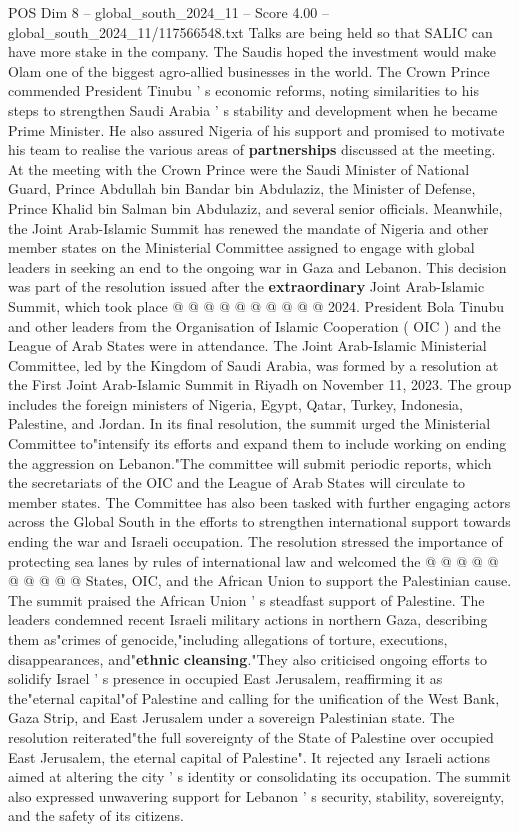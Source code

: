 \begin{textsample}{POS Dim 8 – global\_south\_2024\_11 – Score 4.00 – global\_south\_2024\_11/117566548.txt}  \label{ex:f8_pos_156}
Talks are being held so that SALIC can have more stake in the company.
The Saudis hoped the investment would make Olam one of the biggest agro-allied businesses in the world.
The Crown Prince commended President Tinubu ' s economic reforms, noting similarities to his steps to strengthen Saudi Arabia ' s stability and development when he became Prime Minister.
He also assured Nigeria of his support and promised to motivate his team to realise the various areas of \textbf{partnerships} discussed at the meeting.
At the meeting with the Crown Prince were the Saudi Minister of National Guard, Prince Abdullah bin Bandar bin Abdulaziz, the Minister of Defense, Prince Khalid bin Salman bin Abdulaziz, and several senior officials.
Meanwhile, the Joint Arab-Islamic Summit has renewed the mandate of Nigeria and other member states on the Ministerial Committee assigned to engage with global leaders in seeking an end to the ongoing war in Gaza and Lebanon.
This decision was part of the resolution issued after the \textbf{extraordinary} Joint Arab-Islamic Summit, which took place @ @ @ @ @ @ @ @ @ @ 2024.
President Bola Tinubu and other leaders from the Organisation of Islamic Cooperation ( OIC ) and the League of Arab States were in attendance.
The Joint Arab-Islamic Ministerial Committee, led by the Kingdom of Saudi Arabia, was formed by a resolution at the First Joint Arab-Islamic Summit in Riyadh on November 11, 2023.
The group includes the foreign ministers of Nigeria, Egypt, Qatar, Turkey, Indonesia, Palestine, and Jordan.
In its final resolution, the summit urged the Ministerial Committee to"intensify its efforts and expand them to include working on ending the aggression on Lebanon."The committee will submit periodic reports, which the secretariats of the OIC and the League of Arab States will circulate to member states.
The Committee has also been tasked with further engaging actors across the Global South in the efforts to strengthen international support towards ending the war and Israeli occupation.
The resolution stressed the importance of protecting sea lanes by rules of international law and welcomed the @ @ @ @ @ @ @ @ @ @ States, OIC, and the African Union to support the Palestinian cause.
The summit praised the African Union ' s steadfast support of Palestine.
The leaders condemned recent Israeli military actions in northern Gaza, describing them as"crimes of genocide,"including allegations of torture, executions, disappearances, and"\textbf{ethnic} \textbf{cleansing}."They also criticised ongoing efforts to solidify Israel ' s presence in occupied East Jerusalem, reaffirming it as the"eternal capital"of Palestine and calling for the unification of the West Bank, Gaza Strip, and East Jerusalem under a sovereign Palestinian state.
The resolution reiterated"the full sovereignty of the State of Palestine over occupied East Jerusalem, the eternal capital of Palestine".
It rejected any Israeli actions aimed at altering the city ' s identity or consolidating its occupation.
The summit also expressed unwavering support for Lebanon ' s security, stability, sovereignty, and the safety of its citizens.

\end{textsample}
